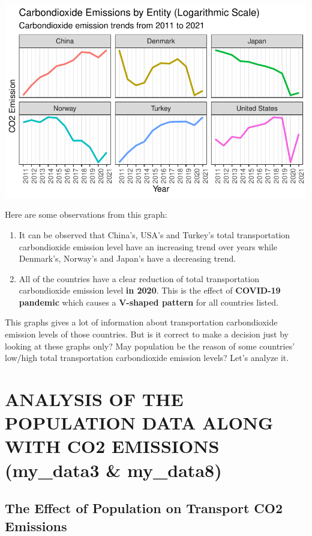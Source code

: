 \documentclass[
  11pt,
  a4paper,
  DIV=11,
  numbers=noendperiod]{scrartcl}
\begin{document}
\includegraphics{analysis_files/figure-pdf/unnamed-chunk-7-1.pdf}

Here are some observations from this graph:

\begin{enumerate}
\def\labelenumi{\arabic{enumi}.}
\item
  It can be observed that China's, USA's and Turkey's total
  transportation carbondioxide emission level have an increasing trend
  over years while Denmark's, Norway's and Japan's have a decreasing
  trend.
\item
  All of the countries have a clear reduction of total transportation
  carbondioxide emission level \textbf{in 2020}. This is the effect of
  \textbf{COVID-19 pandemic} which causes a \textbf{V-shaped pattern}
  for all countries listed.
\end{enumerate}

This graphs gives a lot of information about transportation
carbondioxide emission levels of those countries. But is it correct to
make a decision just by looking at these graphs only? May population be
the reason of some countries' low/high total transportation
carbondioxide emission levels? Let's analyze it.

\section{ANALYSIS OF THE POPULATION DATA ALONG WITH CO2 EMISSIONS
(my\_data3 \&
my\_data8)}\label{analysis-of-the-population-data-along-with-co2-emissions-my_data3-my_data8}

\subsection{The Effect of Population on Transport CO2
Emissions}\label{the-effect-of-population-on-transport-co2-emissions}
\end{document}
